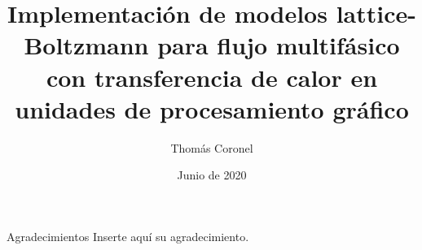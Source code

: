 \documentclass[12pt,screen,oneside,pagebackref]{ibtesis}
\title{Implementaci\'on de modelos lattice-Boltzmann para flujo multif\'asico con transferencia de calor en unidades de procesamiento gr\'afico}
\author{Thom\'as Coronel}
\date{Junio de 2020}
\begin{document}


\begin{preliminary}





\tableofcontents                %



%
%

\end{preliminary}

%


%
%
%
%
%
%
%

\appendix
%
%
%

\begin{biblio}

\end{biblio}


\begin{seccion}{Agradecimientos}
Inserte aquí su agradecimiento.

\end{seccion}
\end{document}
